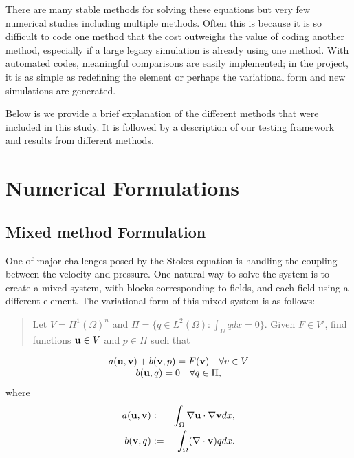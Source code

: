 There are many stable methods for solving these equations but
 very few numerical studies including multiple methods. Often this is because
 it is so difficult to code one method that the cost outweighs the value of
 coding another method, especially if a large legacy simulation is already
 using one method.  With automated codes, meaningful comparisons are
 easily implemented; in the \fenics{} project, it is as simple as redefining the
 element or perhaps the variational form and new simulations are generated.

 Below is we provide a brief explanation of the different methods that were
 included in this study.  It is followed by a description of our testing
 framework and results from different methods.



\section{Numerical Formulations}

\subsection{Mixed method Formulation}

One of major challenges posed by the Stokes equation is handling the coupling
between the velocity and pressure.  One natural way to solve the system is to
create a mixed system, with blocks corresponding to fields, and each field
using a different element.  The variational form of this mixed system is as
follows:
\begin{quote}
  Let $V = H^1(\Omega)^n$ and $\Pi = \{q\in L^2(\Omega):\int_\Omega q
  dx = 0\}$. Given $F\in V'$, find functions ${\bf u}\in V$ and $p \in
  \Pi$ such that
\end{quote}
\begin{equation*}
\label{terrel:eqn:MixedStokes}
  \begin{array}{c}
    a({\bf u},{\bf v})+b({\bf v},p)  =  F({\bf v})\quad \forall v \in V\\
    b({\bf u},q) = 0\quad \forall q \in \Pi,
  \end{array}
\end{equation*}
where
\begin{eqnarray*}
  a({\bf u},{\bf v}) & := & \int_\Omega \nabla{{\bf u}}\cdot\nabla{{\bf v}} dx, \\
  b({\bf v}, q) & :=  & \int_\Omega (\nabla\cdot{{\bf v}}) q dx.
\end{eqnarray*}

